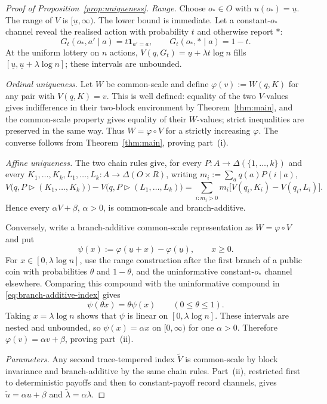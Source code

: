 \documentclass[11pt,a4paper]{article}
\theoremstyle{definition}
\newcommand{\D}{\Delta}
\newcommand{\1}{\mathbf 1}
\begin{document}
\begin{proof}[Proof of Proposition~\ref{prop:uniqueness}]
\emph{Range.}
Choose $o_*\in O$ with $u(o_*)=\underline u$.  The range of $V$ is
$[\underline u,\infty)$.  The lower bound is immediate.  Let a constant-$o_*$
channel reveal the realised action with probability $t$ and otherwise report $*$:
\[
 G_t(o_*,a'\mid a)=t\1_{a'=a},
 \qquad
 G_t(o_*,*\mid a)=1-t.
\]
At the uniform lottery on $n$ actions,
$V(q,G_t)=\underline u+\lambda t\log n$ fills
$[\underline u,\underline u+\lambda\log n]$; these intervals are unbounded.

\emph{Ordinal uniqueness.}
Let $W$ be common-scale and define
$\varphi(v):=W(q,K)$ for any pair with $V(q,K)=v$.  This is well defined: equality of the two $V$-values gives
indifference in their two-block environment by Theorem~\ref{thm:main}, and the common-scale property gives equality
of their $W$-values; strict inequalities are preserved in the same way.  Thus
$W=\varphi\circ V$ for a strictly increasing $\varphi$.  The converse follows from
Theorem~\ref{thm:main}, proving part~\textup{(i)}.

\emph{Affine uniqueness.}
The two chain rules give, for every
$P:A\to\D(\{1,\ldots,k\})$ and every
$K_1,\ldots,K_k,L_1,\ldots,L_k:A\to\D(O\times R)$, writing
$m_i:=\sum_aq(a)P(i\mid a)$,
\[
 V\bigl(q,P\triangleright(K_1,\ldots,K_k)\bigr)
 -V\bigl(q,P\triangleright(L_1,\ldots,L_k)\bigr)
 =\sum_{i:m_i>0}m_i
 \bigl[V(q_i,K_i)-V(q_i,L_i)\bigr].
\]
Hence every $\alpha V+\beta$, $\alpha>0$, is common-scale and branch-additive.

Conversely, write a branch-additive common-scale representation as
$W=\varphi\circ V$ and put
\[
 \psi(x):=\varphi(\underline u+x)-\varphi(\underline u),
 \qquad x\ge0.
\]
For $x\in[0,\lambda\log n]$, use the range construction after the first
branch of a public coin with probabilities $\theta$ and $1-\theta$, and the
uninformative constant-$o_*$ channel elsewhere.  Comparing this compound with
the uninformative compound in \eqref{eq:branch-additive-index} gives
\[
 \psi(\theta x)=\theta\psi(x)
 \qquad(0\le\theta\le1).
\]
Taking $x=\lambda\log n$ shows that $\psi$ is linear on $[0,\lambda\log n]$.  These intervals are nested and
unbounded, so $\psi(x)=\alpha x$ on $[0,\infty)$ for one $\alpha>0$.  Therefore
$\varphi(v)=\alpha v+\beta$, proving part~\textup{(ii)}.

\emph{Parameters.}
Any second trace-tempered index $\widetilde V$ is common-scale by block
invariance and branch-additive by the same chain rules.  Part~\textup{(ii)},
restricted first to deterministic payoffs and then to constant-payoff record channels, gives
$\widetilde u=\alpha u+\beta$ and $\widetilde\lambda=\alpha\lambda$.
\end{proof}
\end{document}
